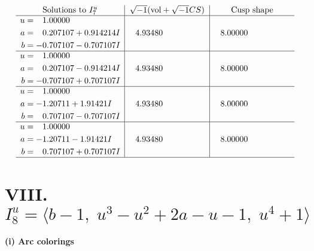 \documentclass[1p]{elsarticle_modified}
\theoremstyle{definition}
\newcommand{\I}{\sqrt{-1}}
\begin{document}
$$\begin{array}{c|c|c}  
\text{Solutions to }I^u_{7}& \I (\text{vol} + \sqrt{-1}CS) & \text{Cusp shape}\\
 \hline 
\begin{aligned}
u &= \phantom{-}1.00000\phantom{ +0.000000I} \\
a &= \phantom{-}0.207107 + 0.914214 I \\
b &= -0.707107 - 0.707107 I\end{aligned}
 & \phantom{-}4.93480\phantom{ +0.000000I} & \phantom{-}8.00000\phantom{ +0.000000I} \\ \hline\begin{aligned}
u &= \phantom{-}1.00000\phantom{ +0.000000I} \\
a &= \phantom{-}0.207107 - 0.914214 I \\
b &= -0.707107 + 0.707107 I\end{aligned}
 & \phantom{-}4.93480\phantom{ +0.000000I} & \phantom{-}8.00000\phantom{ +0.000000I} \\ \hline\begin{aligned}
u &= \phantom{-}1.00000\phantom{ +0.000000I} \\
a &= -1.20711 + 1.91421 I \\
b &= \phantom{-}0.707107 - 0.707107 I\end{aligned}
 & \phantom{-}4.93480\phantom{ +0.000000I} & \phantom{-}8.00000\phantom{ +0.000000I} \\ \hline\begin{aligned}
u &= \phantom{-}1.00000\phantom{ +0.000000I} \\
a &= -1.20711 - 1.91421 I \\
b &= \phantom{-}0.707107 + 0.707107 I\end{aligned}
 & \phantom{-}4.93480\phantom{ +0.000000I} & \phantom{-}8.00000\phantom{ +0.000000I}\\
 \hline 
 \end{array}$$\newpage\newpage\renewcommand{\arraystretch}{1}
\centering \section*{VIII. $I^u_{8}= \langle b-1,\;u^3- u^2+2 a- u-1,\;u^4+1 \rangle$}
\flushleft \textbf{(i) Arc colorings}\\
\end{document}
